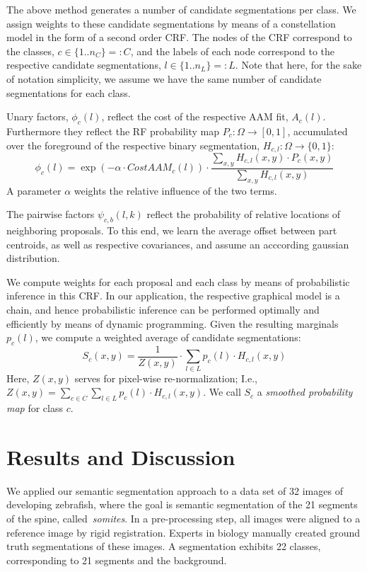 \documentclass[10pt,twocolumn,letterpaper]{article}
\begin{document}
The above method generates a number of candidate segmentations per class. 
%
We assign weights to these candidate segmentations by means of a constellation model in the form of a second order CRF. 
%
The nodes of the CRF correspond to the classes, $c\in \{1..n_C\}=:C$, and the labels of each node correspond to the respective candidate segmentations, $l\in \{1..n_L\}=:L$. 
Note that here, for the sake of notation simplicity, we assume we have the same number of candidate segmentations for each class. 

Unary factors, $\phi_c(l)$, reflect the cost of the respective AAM fit, $A_c(l)$. Furthermore they reflect the RF probability map $P_c:\Omega\rightarrow [ 0,1 ]$, accumulated over the foreground of the respective binary segmentation, $H_{c,l}: \Omega\rightarrow \{0,1\}$: 
\begin{equation}
\phi_c(l) = \exp{(-\alpha\cdot CostAAM_c(l))} \cdot \frac{\sum_{x,y} H_{c,l}(x,y)\cdot P_c(x,y)}{\sum_{x,y} H_{c,l}(x,y)}
\label{eq:unaries}
\end{equation}
A parameter $\alpha$ weights the relative influence of the two terms. 

The pairwise factors $\psi_{c,b}(l,k)$ reflect the probability of relative locations of neighboring proposals. To this end, we learn the average offset between part centroids, as well as respective covariances, and assume an acccording gaussian distribution. 

We compute weights for each proposal and each class by means of probabilistic inference in this CRF. In our application, the respective graphical model is a chain, and hence probabilistic inference can be performed optimally and efficiently by means of dynamic programming. 
%
Given the resulting marginals $p_c(l)$, we compute a weighted average of candidate segmentations: 
\begin{equation}
 S_c(x,y) = \frac{1}{Z(x,y)} \cdot \sum_{l\in L} p_c(l)\cdot H_{c,l}(x,y) 
\label{eq:weighting}
\end{equation}
%
Here, $Z(x,y)$ serves for pixel-wise re-normalization; I.e., $Z(x,y)=\sum_{c\in C}\sum_{l\in L} p_c(l)\cdot H_{c,l}(x,y)$.
%
We call $S_c$ a \emph{smoothed probability map} for class $c$. 

\section{Results and Discussion}

We applied our semantic segmentation approach to a data set of 32 images of developing zebrafish, where the goal is semantic segmentation of the 21 segments of the spine, called~\emph{somites}. In a pre-processing step, all images were aligned to a reference image by rigid registration. Experts in biology manually created ground truth segmentations of these images. A segmentation exhibits 22 classes, corresponding to 21 segments and the background. 
\end{document}
